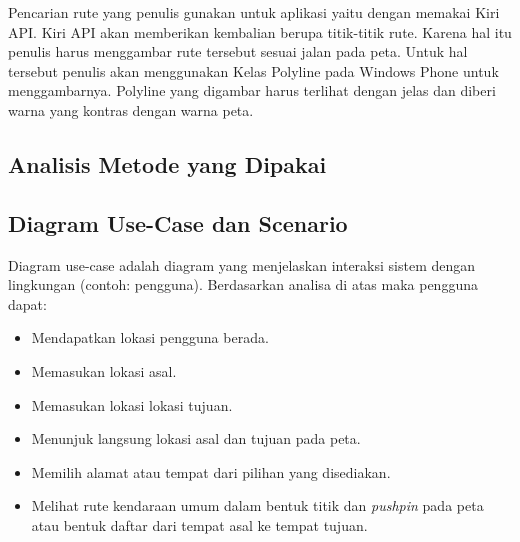 \hspace{0.5cm} Pencarian rute yang penulis gunakan untuk aplikasi yaitu dengan memakai Kiri API. Kiri API akan memberikan kembalian berupa titik-titik rute. Karena hal itu penulis harus menggambar rute tersebut sesuai jalan pada peta. Untuk hal tersebut penulis akan menggunakan Kelas Polyline pada Windows Phone untuk menggambarnya. Polyline yang digambar harus terlihat dengan jelas dan diberi warna yang kontras dengan warna peta.

\subsection{Analisis Metode yang Dipakai}
\label{lab:Analisis Metode yang Dipakai}


\subsection{Diagram Use-Case dan Scenario}
\label{lab:Diagram Use-Case dan Scenario}
\hspace{0.5cm} Diagram use-case adalah diagram yang menjelaskan interaksi sistem dengan lingkungan (contoh: pengguna). Berdasarkan analisa di atas maka pengguna dapat:
\begin{itemize}
	\item Mendapatkan lokasi pengguna berada.
	\item Memasukan lokasi asal.
	\item Memasukan lokasi lokasi tujuan.
	\item Menunjuk langsung lokasi asal dan tujuan pada peta.
	\item Memilih alamat atau tempat dari pilihan yang disediakan.
	\item Melihat rute kendaraan umum dalam bentuk titik dan \textit{pushpin} pada peta atau bentuk daftar dari tempat asal ke tempat tujuan.
\end{itemize}

